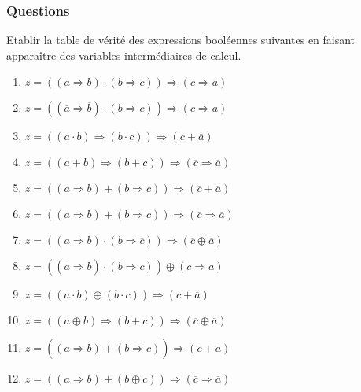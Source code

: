 \subsubsection{Questions}

Etablir la table de vérité des expressions booléennes suivantes en faisant apparaître des variables intermédiaires de calcul.

\noindent\begin{minipage}[t]{7cm}
\begin{enumerate}  
\item $z = ((a \Rightarrow b) \cdot (b \Rightarrow \overline{c})) \Rightarrow (\overline{c} \Rightarrow \overline{a})$
\item $z = ((\overline{a} \Rightarrow \overline{b}) \cdot (b \Rightarrow c)) \Rightarrow ({c} \Rightarrow {a})$
\item $z = ((a \cdot b) \Rightarrow (b \cdot c)) \Rightarrow ({c} + \overline{a})$
\item $z = ((a + b) \Rightarrow (b + c)) \Rightarrow (\overline{c} \Rightarrow \overline{a})$
\item $z = ((a \Rightarrow b) + (b \Rightarrow c)) \Rightarrow (\overline{c} + \overline{a})$
\item $z = ((a \Rightarrow b) + (b \Rightarrow c)) \Rightarrow (\overline{c} \Rightarrow \overline{a})$
\item $z = ((a \Rightarrow b) \cdot (b \Rightarrow \overline{c})) \Rightarrow (\overline{c} \oplus \overline{a})$
\item $z = ((\overline{a} \Rightarrow \overline{b}) \cdot (b \Rightarrow c)) \oplus ({c} \Rightarrow {a})$
\item $z = ((a \cdot b) \oplus (b \cdot c)) \Rightarrow ({c} + \overline{a})$
\item $z = ((a \oplus b) \Rightarrow (b + c)) \Rightarrow (\overline{c} \oplus \overline{a})$
\item $z = ((a \Rightarrow b) + \overline{(b \Rightarrow c)}) \Rightarrow (\overline{c} + \overline{a})$ 
\item $z = ((a \Rightarrow b) + (b \oplus c)) \Rightarrow (\overline{c} \Rightarrow \overline{a})$
\end{enumerate}
\end{minipage}
